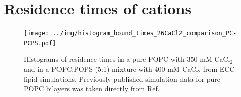 \documentclass[journal=jctcce,manuscript=article]{achemso}
\begin{document}
\pagebreak
\section{Residence times of cations}

%




\begin{figure}[!h]
  \centering
  \texttt{[image: ../img/histogram\_bound\_times\_26CaCl2\_comparison\_PC-PCPS.pdf]}
  \caption{\label{fig:hist_residence_times}
    Histograms of   residence times in a pure POPC with 350 mM CaCl$_2$
    and in a POPC:POPS (5:1) mixture with 400 mM CaCl$_2$ from ECC-lipid simulations.
    Previously published simulation data \cite{melcr18} for pure POPC bilayers was taken directly from Ref.~.
  }
\end{figure}



 
 
\end{document}
